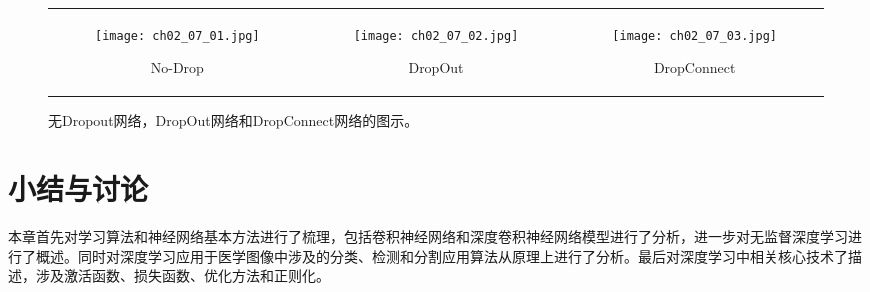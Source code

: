 \begin{figure}
	\centering
	\begin{tabular}[c]{ccc}
		\begin{subfigure}[c]{0.27\textwidth}
			\texttt{[image: ch02\_07\_01.jpg]}
			\caption{No-Drop}
			\label{fig:nodrop}
		\end{subfigure}&
		\begin{subfigure}[c]{0.27\textwidth}
			\texttt{[image: ch02\_07\_02.jpg]}
			\caption{DropOut}
			\label{fig:dropout}
		\end{subfigure}&
		\begin{subfigure}[c]{0.27\textwidth}
			\texttt{[image: ch02\_07\_03.jpg]}
			\caption{DropConnect}
			\label{fig:dropconnect}	
		\end{subfigure}			
	\end{tabular}    
	\caption{无Dropout网络，DropOut网络和DropConnect网络的图示。}
	\label{fig:CNN_DropConnect}
\end{figure}

\section{小结与讨论}

本章首先对学习算法和神经网络基本方法进行了梳理，包括卷积神经网络和深度卷积神经网络模型进行了分析，进一步对无监督深度学习进行了概述。同时对深度学习应用于医学图像中涉及的分类、检测和分割应用算法从原理上进行了分析。最后对深度学习中相关核心技术了描述，涉及激活函数、损失函数、优化方法和正则化。 